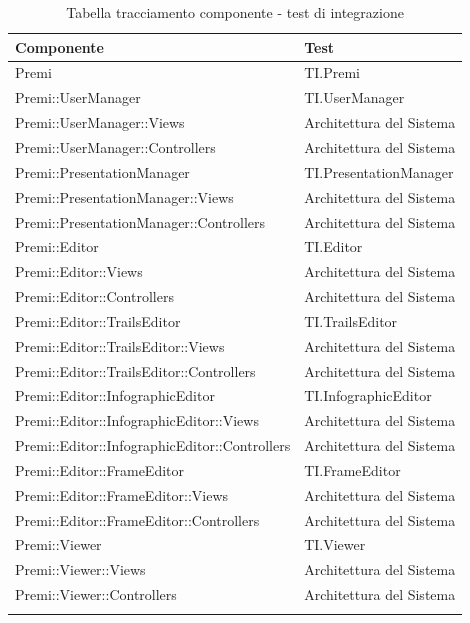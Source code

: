 \begin{longtable}{|l|l|}
	\hline
	\textbf{Componente} & \textbf{Test} \\
	\hline
	Premi & TI.Premi \\
	\hline
	Premi::UserManager & TI.UserManager \\
	\hline
	Premi::UserManager::Views & Architettura del Sistema \\
	\hline
	Premi::UserManager::Controllers & Architettura del Sistema \\
	\hline
	Premi::PresentationManager & TI.PresentationManager \\
	\hline
	Premi::PresentationManager::Views & Architettura del Sistema \\
	\hline
	Premi::PresentationManager::Controllers & Architettura del Sistema \\
	\hline
    Premi::Editor & TI.Editor \\
    \hline
	Premi::Editor::Views & Architettura del Sistema \\
	\hline
	Premi::Editor::Controllers & Architettura del Sistema \\
	\hline
	Premi::Editor::TrailsEditor & TI.TrailsEditor \\
	\hline
	Premi::Editor::TrailsEditor::Views & Architettura del Sistema \\
    \hline
    Premi::Editor::TrailsEditor::Controllers & Architettura del Sistema \\
	\hline
	Premi::Editor::InfographicEditor & TI.InfographicEditor\\
    \hline
    Premi::Editor::InfographicEditor::Views & Architettura del Sistema \\
    \hline
    Premi::Editor::InfographicEditor::Controllers & Architettura del Sistema \\
   	\hline
   	Premi::Editor::FrameEditor & TI.FrameEditor\\
   	\hline
   	Premi::Editor::FrameEditor::Views & Architettura del Sistema \\
   	\hline
   	Premi::Editor::FrameEditor::Controllers & Architettura del Sistema \\
   	\hline
   	Premi::Viewer & TI.Viewer\\
   	\hline
   	Premi::Viewer::Views & Architettura del Sistema \\
   	\hline
   	Premi::Viewer::Controllers & Architettura del Sistema \\
    \hline
	\caption{Tabella tracciamento componente - test di integrazione}
\end{longtable}



